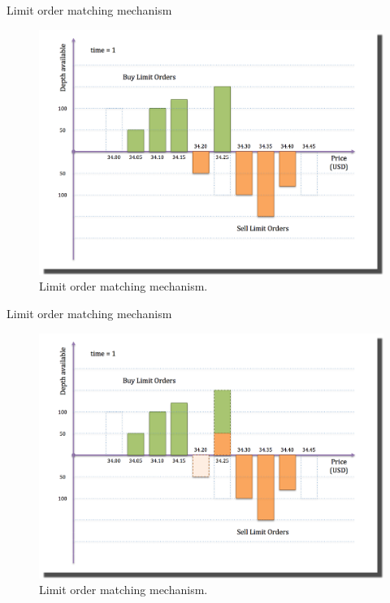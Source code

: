 \documentclass{beamer}
\begin{document}
\begin{frame}[shrink=30]{{\color{cyan}Limit order matching mechanism}}
\bigskip
\begin{figure}[H]
	\centering
	\includegraphics[height=0.9\textheight]{LOB_Match/LOB_Match_1.png}
        \caption{Limit order matching mechanism.}
        \label{fig:LOB_1}
\end{figure}
\end{frame}

\begin{frame}[shrink=30]{{\color{cyan}Limit order matching mechanism}}
\bigskip
\begin{figure}[H]
	\centering
	\includegraphics[height=0.9\textheight]{LOB_Match/LOB_Match_2.png}
        \caption{Limit order matching mechanism.}
        \label{fig:LOB_2}
\end{figure}
\end{frame}
\end{document}
